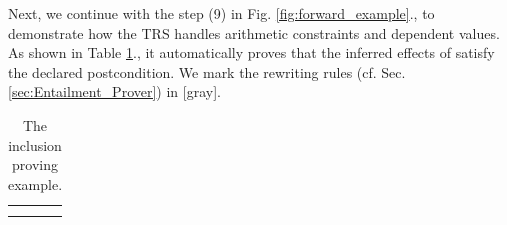\documentclass[acmsmall,10pt,review]{acmart}
\newcommand{\effect}{\textcolor{black}{\ensuremath{\mathrm{\Phi}}}}
\newcommand{\anyevent}[1]{{\textcolor{darkred}
{{\textbf{\footnotesize #1}}}}}
\newcommand{\code}[1]{{\tt{\ensuremath{\m{#1}}}}}
\newcommand{\m}{\mathit}
\newcommand{\mysharp}{{\mathrel{\texttt{\#}}}}
\newcommand\figref[1]{Fig. \textcolor{black}{\ref{#1}}.}
\newcommand\tabref[1]{Table \textcolor{black}{\ref{#1}}.}
\newcommand\secref[1]{Sec. \textcolor{black}{\ref{#1}}}
\begin{document}
{%



Next, we continue with the step (9) in \figref{fig:forward_example}, to 
demonstrate how the TRS handles arithmetic constraints and dependent values. 
As shown in \tabref{tab:rewriting_tree_send}, it automatically proves that the inferred effects of {}
 satisfy the declared postcondition. 
We mark the rewriting rules (cf. \secref{sec:Entailment_Prover}) in \textcolor{mGray}{[gray]}.

{
\begin{table}[ht]
\centering
      \vspace{0mm}
\caption{\label{tab:rewriting_tree_send} The inclusion proving example. }
      
\vspace{-1mm}
\begin{adjustbox}{width=1\textwidth}
 \Large\begin{tabular}[t]{l}
  \hline\\
{

}
\end{tabular}
\end{adjustbox}
\end{table}}}
\end{document}

